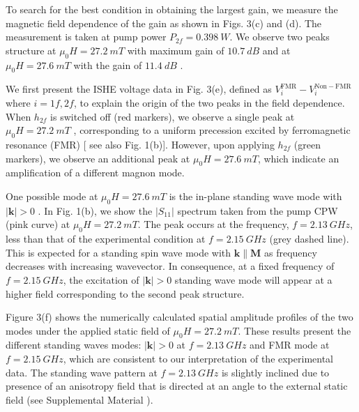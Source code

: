 \documentclass[%
 reprint,
 amsmath,amssymb,
 aps,
prb,
]{revtex4-2}
\begin{document}
To search for the best condition in obtaining the largest gain, we measure the magnetic field dependence of the gain as shown in Figs. 3(c) and (d). The measurement is taken at pump power $P_{2f}=0.398\ \si{W}$. We observe two peaks structure at $\mu_0H=27.2\ \si{mT}$ with maximum gain of $ 10.7\ \si{dB}$ and at $\mu_0H=27.6\ \si{mT}$ with the gain of $11.4\ \si{dB}$ .  

We first present the ISHE voltage data in Fig. 3(e), defined as $V_{i}^{\mathrm{FMR}}-V_{i}^{\mathrm{Non-FMR}}$ where $i= 1f, 2f$, to explain the origin of the two peaks in the field dependence. When $h_{2f}$ is switched off (red markers), we observe a single peak at  $\mu_0H=27.2\ \si{mT}$ , corresponding to a uniform precession excited by ferromagnetic resonance (FMR) [ see also Fig. 1(b)]. However, upon applying $h_{2f}$ (green markers), we observe an additional peak at $\mu_0H=27.6\ \si{mT}$, which indicate an amplification of a different magnon mode.

One possible mode at $\mu_0H=27.6\ \si{mT}$  is the in-plane standing wave mode with $|\mathbf{k}| > 0$ \cite{Guo2014,Hioki12022}. In Fig. 1(b), we show the $|S_{11}|$ spectrum taken from the pump CPW (pink curve) at $\mu_0H=27.2\ \si{mT}$. The peak occurs at the frequency, $f = 2.13\ \si{GHz}$, less than that of the experimental condition at $f = 2.15\ \si{GHz}$ (grey dashed line). This is expected for a standing spin wave mode with $\mathbf{k} \parallel \mathbf{M} $  as frequency decreases with increasing wavevector. In consequence, at a fixed frequency of $f = 2.15\ \si{GHz}$, the excitation of $|\mathbf{k}| > 0$ standing wave mode will appear at a higher field corresponding to the second peak structure.

Figure 3(f) shows the numerically calculated spatial amplitude profiles of the two modes under the applied static field of $\mu_0H=27.2\ \si{mT}$. These results present the different standing waves modes: $|\mathbf{k}| > 0$ at $f = 2.13\ \si{GHz}$ and FMR mode at $f = 2.15\ \si{GHz}$, which are consistent to our interpretation of  the experimental data. The standing wave pattern at $f = 2.13\ \si{GHz}$ is slightly inclined due to presence of an anisotropy field that is directed at an angle to the external static field (see Supplemental Material \cite{Suppl}).  
\end{document}
